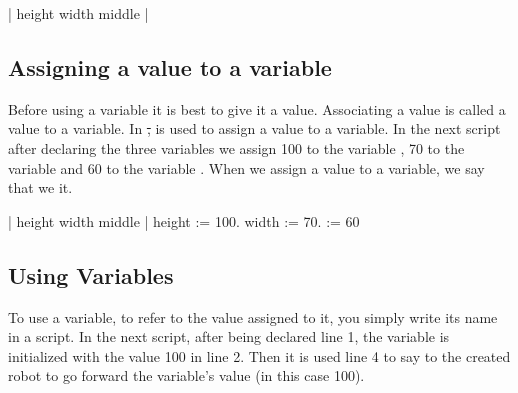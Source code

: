 \begin{nalltt}
| height width middle |
\end{nalltt}



\subsection*{Assigning a value to a variable}
Before using a variable it is \newcommand{\replace}[2]{better}{best} to give it a value. Associating a value is called  a value to a variable. In \st, \ct{:=} is used to assign a value to a variable. In the \newcommand{\replace}[2]{following}{next} script after declaring the three variables we assign 100 to 
the variable , 70 to the variable  and 60 to the variable \ct{\dist}.
When \newcommand{\remove}[1]{this is the first time that} we assign a value to a variable\newcommand{\add}[1]{ for the first time}, we say that we \newcommand{\add}[1]{are}  it.

\begin{nalltt}
| height width middle |
height := 100.
width := 70.
\dist := 60
\end{nalltt}



\subsection*{Using Variables}
To use a variable, \ie to refer to the value assigned to it, you
simply write its name in a script. In the \newcommand{\replace}[2]{following}{next} script, after being declared \newcommand{\add}[1]{in} line 1, the variable  is initialized  with the value 100 in line 2\newcommand{\replace}[2]{ and}{. Then it is} used \newcommand{\add}[1]{in} line 4 to say to the created robot to go forward \newcommand{\remove}[1]{from} the   variable's value\newcommand{\replace}[2]{, here 100}{ (in this case 100)}.

